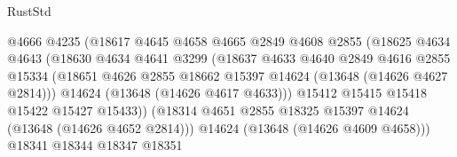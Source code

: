 \begin{lexlean}{RustStd}
\begin{coremodule}
                                      @4666
                                      @4235
                                      (@18617
                                        @4645
                                        @4658
                                        @4665
                                        @2849
                                        @4608
                                        @2855
                                        (@18625
                                          @4634
                                          @4643
                                          (@18630
                                            @4634
                                            @4641
                                            @3299
                                            (@18637
                                              @4633
                                              @4640
                                              @2849
                                              @4616
                                              @2855
                                              @15334
                                              (@18651
                                                @4626
                                                @2855
                                                @18662
                                                @15397
                                                @14624
                                                (@13648 (@14626 @4627 @2814)))
                                              @14624
                                              (@13648 (@14626 @4617 @4633)))
                                            @15412
                                            @15415
                                            @15418
                                            @15422
                                            @15427
                                            @15433))
                                        (@18314
                                          @4651
                                          @2855
                                          @18325
                                          @15397
                                          @14624
                                          (@13648 (@14626 @4652 @2814)))
                                        @14624
                                        (@13648 (@14626 @4609 @4658)))
                                      @18341
                                      @18344
                                      @18347
                                      @18351

\end{coremodule}
\end{lexlean}
